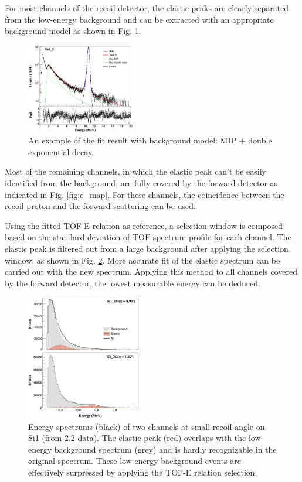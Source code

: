 \documentclass[number,5p]{elsarticle}
\begin{document}
For most channels of the recoil detector, the elastic peaks are clearly
separated from the low-energy background
and can be extracted with an appropriate background model as shown in Fig. \ref{fig:e_fit}.
\begin{figure}[h!]
  \centering
  \includegraphics[width=0.42\textwidth]{./e_fit.png}
  \caption{An example of the fit result with background model: MIP + double
    exponential decay.}
  \label{fig:e_fit}
\end{figure}
Most of the remaining channels, in which the elastic peak can't be easily identified from the
background, are fully covered by the forward detector as indicated in Fig. \ref{fig:e_map}.
For these channels, the coincidence between the recoil proton and the forward
scattering can be used.


Using the fitted TOF-E relation as reference, a selection window is composed
based on the standard deviation of TOF spectrum profile for each channel.
The elastic peak is filtered out from a large background after applying the selection window, as shown in Fig. \ref{fig:cut}.
More accurate fit of the elastic spectrum can be carried out with the new spectrum.
Applying this method to all channels covered by the forward detector, the lowest
measurable energy can be deduced.
\begin{figure}[h!]
  \centering
  \includegraphics[width=0.45\textwidth]{./comparison_tof_e_cut_2.2_angle.png}
  \caption{Energy spectrums (black) of two channels at small recoil angle on Si1 (from
    \SI{2.2}{\momentum} data). The elastic peak (red) overlaps with the low-energy background
    spectrum (grey) and is hardly recognizable in the original spectrum. These low-energy background events are effectively surpressed by applying the TOF-E relation selection.}
  \label{fig:cut}
\end{figure}
\end{document}
